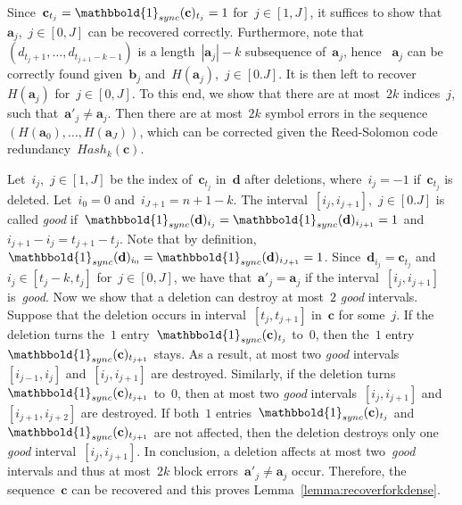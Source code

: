 \documentclass[10pt,a4paper,onecolumn]{IEEEtran}
\newcommand{\1}{\mathbbold{1}}
\newcommand{\bolda}{\mathbf{a}}
\newcommand{\boldb}{\mathbf{b}}
\newcommand{\boldc}{\mathbf{c}}
\newcommand{\boldd}{\mathbf{d}}
\begin{document}
Since~$\boldc_{t_j}=\1_{sync}(\boldc)_{t_j}=1$ for~$j\in[1,J]$, it suffices to show that~$\bolda_j$,~$j\in[0,J]$ can be recovered
correctly. Furthermore, note that $(d_{t_{j}+1},\ldots,d_{t_{j+1}-k-1})$ is a length~$|\bolda_j|-k$ subsequence of~$\bolda_j$, hence ~$\bolda_j$ can be correctly found given~$\boldb_j$ and~$H(\bolda_j)$,~$j\in [0.J]$.  
It is then left to recover~$H(\bolda_j)$ for~$j\in [0,J]$. To this end, we show that there are at most~$2k$ indices~$j$, such that~$\bolda'_j\ne \bolda_j$. Then there are at most~$2k$ symbol errors in the sequence~$(H(\bolda_0),\ldots,H(\bolda_J))$, which can be corrected given the Reed-Solomon code redundancy~$Hash_k(\boldc)$. 

Let~$i_j$,~$j\in[1,J]$ be the index of~$\boldc_{t_j}$ in~$\boldd$ after deletions, where~$i_j=-1$ if~$\boldc_{t_j}$ is deleted. Let~$i_0=0$ and~$i_{J+1}=n+1-k$.
The interval~$[i_j,i_{j+1}]$,~$j\in [0.J]$ is called \emph{good} if~$\1_{sync}(\boldd)_{i_j}=\1_{sync}(\boldd)_{i_{j+1}}=1$ and~$i_{j+1}-i_j=t_{j+1}-t_{j}$. Note that by definition,~$\1_{sync}(\boldd)_{i_0}=\1_{sync}(\boldd)_{i_{J+1}}=1$. Since~$\boldd_{i_j}=\boldc_{t_j}$ and~$i_j\in [t_j-k,t_j]$ for~$j\in[0,J]$, we have that~$\bolda'_{j}=\bolda_j$ if the interval~$[i_j,i_{j+1}]$ is~\emph{good}. 
Now we show that a deletion can destroy at most~$2$ \emph{good} intervals. 
Suppose that the deletion occurs in interval~$[t_j,t_{j+1}]$ in~$\boldc$ for some~$j$. 
If the deletion turns the~$1$ entry~$\1_{sync}(\boldc)_{t_j}$ to~$0$, then the~$1$ entry~$\1_{sync}(\boldc)_{t_{j+1}}$ stays. As a result, at most two \emph{good} intervals~$[i_{j-1},i_j]$ and~$[i_{j},i_{j+1}]$ are destroyed. Similarly, if the deletion turns~$\1_{sync}(\boldc)_{t_{j+1}}$ to~$0$, then at most two \emph{good} intervals~$[i_j,i_{j+1}]$ and~$[i_{j+1},i_{j+2}]$ are destroyed. If both~$1$ entries~$\1_{sync}(\boldc)_{t_j}$ and~$\1_{sync}(\boldc)_{t_{j+1}}$ are not affected, then the deletion destroys only one \emph{good} interval~$[i_{j},i_{j+1}]$. In conclusion, a deletion affects at most two~\emph{good} intervals and thus at most~$2k$ block errors~$\bolda'_j\ne\bolda_j$ occur.
Therefore, the sequence~$\boldc$ can be recovered and this proves Lemma~\ref{lemma:recoverforkdense}.
\end{document}
